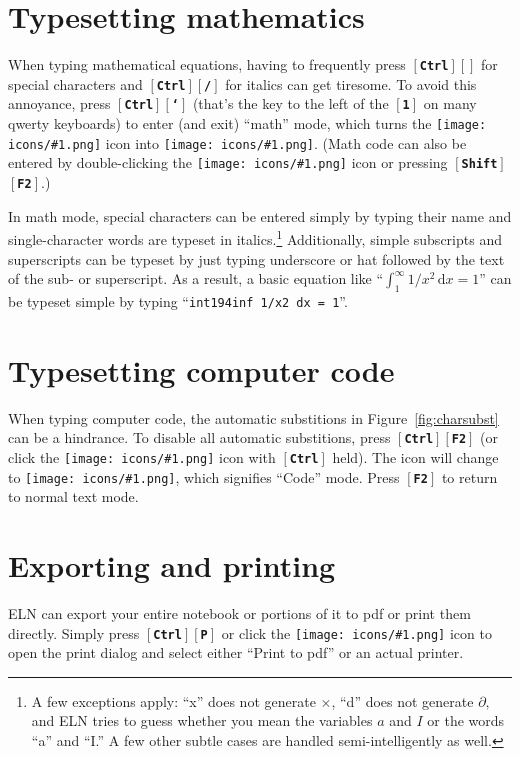 \documentclass[11pt]{report}
\def\keystroke#1{$\left[\right.\!${\tt\bfseries #1}$\!\left.\right]$}
\def\key#1{\keystroke{#1}}
\def\keycombo#1#2{\keystroke{#1}\keystroke{#2}}
\def\keycontrol#1{\keycombo{Ctrl}{#1}}
\def\keyshift#1{\keycombo{Shift}{#1}}
\def\keyctrlbackslash{\keycontrol{\char92}}
\def\icon#1{\raise-2pt\hbox{\texttt{[image: icons/\#1.png]}}}
\begin{document}
\section{Typesetting mathematics}

When typing mathematical equations, having to frequently press
\keyctrlbackslash{} for special characters and \keycontrol{/} for
italics can get tiresome. To avoid this annoyance, press
\keycontrol{`} (that's the key to the left of the \key{1} on many
qwerty keyboards) to enter (and exit) ``math'' mode, which turns the
\icon{type} icon into \icon{type-math}. (Math code can
also be entered by double-clicking the \icon{type} icon
or pressing \keyshift{F2}.)

In math mode, special characters can be entered simply by typing their
name and single-character words are typeset in italics.\footnote{A few
  exceptions apply: ``x'' does not generate $\times$, ``d'' does not
  generate $\partial,$ and ELN tries to guess whether you mean the
  variables $a$ and $I$ or the words ``a'' and ``I.'' A few other
  subtle cases are handled semi-intelligently as well.} Additionally,
simple subscripts and superscripts can be typeset by just typing
underscore or hat followed by the text of the sub- or superscript. As
a result, a basic equation like ``$\int_1^\infty 1/x^2\, \mathrm{d}x =
1$'' can be typeset simple by typing ``{\tt{int1\char94inf
    1/x2 dx = 1}}''.

\section{Typesetting computer code}\label{sec:codemode}

When typing computer code, the automatic substitions in
Figure~\ref{fig:charsubst} can be a hindrance. To disable all
automatic substitions, press \keycontrol{F2} (or click the
\icon{type} icon with \key{Ctrl} held). The icon will
change to \icon{type-code}, which signifies ``Code''
mode. Press \key{F2} to return to normal text mode.

\section{Exporting and printing}

ELN can export your entire notebook or portions of it to pdf or print
them directly. Simply press \keycontrol{P} or click the
\icon{nav-print} icon
to open the print dialog and select either ``Print to pdf'' or an
actual printer.
\end{document}
